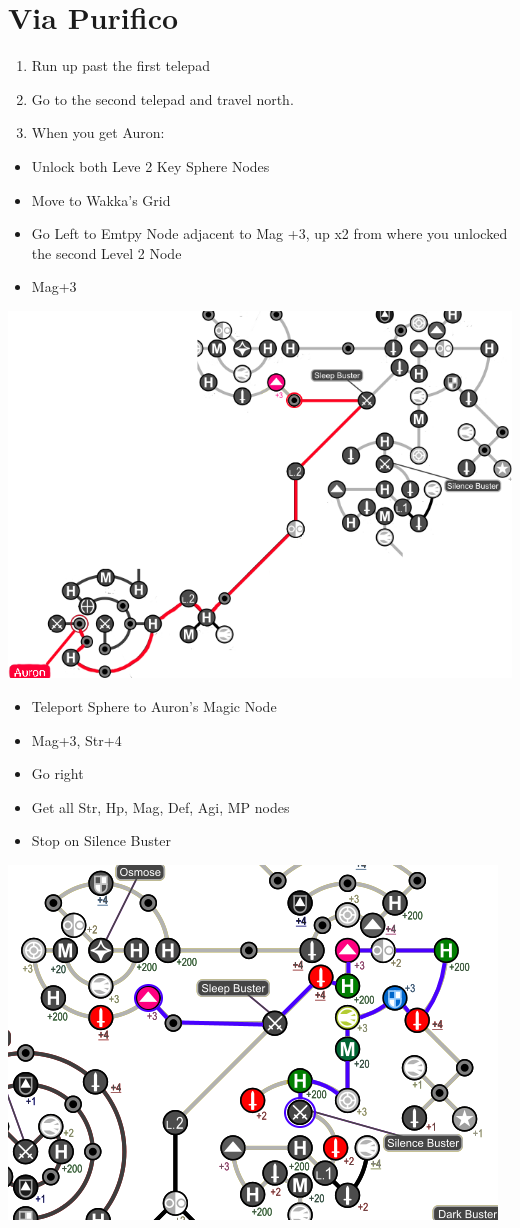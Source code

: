 \chapter{Via Purifico}

\begin{enumerate}
	\item Run up past the first telepad
	\item Go to the second telepad and travel north.
	\item When you get Auron:
\end{enumerate}
\begin{spheregrid}
\begin{itemize}
	\auronf
	\begin{itemize}
		\item Unlock both Leve 2 Key Sphere Nodes
		\item Move to Wakka's Grid
		\item Go Left to Emtpy Node adjacent to Mag +3, up x2 from where you unlocked the second Level 2 Node
		\item Mag+3
	\end{itemize}
	\includegraphics[width=.8\columnwidth]{graphics/Auron_Via_Purifico}
	\yunaf
	\begin{itemize}
		\item Teleport Sphere to Auron's Magic Node
		\item Mag+3, Str+4
		\item Go right
		\item Get all Str, Hp, Mag, Def, Agi, MP nodes
		\item Stop on Silence Buster
	\end{itemize}
	\includegraphics[width=.8\columnwidth]{graphics/Yuna_Via_Purifico}
\end{itemize}
\end{spheregrid}
